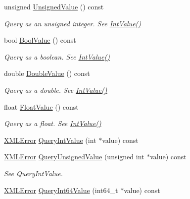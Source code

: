 \begin{DoxyCompactItemize}
\item 
unsigned \hyperlink{classtinyxml2_1_1_x_m_l_attribute_a0be5343b08a957c42c02c5d32c35d338}{Unsigned\+Value} () const
\begin{DoxyCompactList}\small\item\em Query as an unsigned integer. See \hyperlink{classtinyxml2_1_1_x_m_l_attribute_adfa2433f0fdafd5c3880936de9affa80}{Int\+Value()} \end{DoxyCompactList}\item 
bool \hyperlink{classtinyxml2_1_1_x_m_l_attribute_a98ce5207344ad33a265b0422addae1ff}{Bool\+Value} () const
\begin{DoxyCompactList}\small\item\em Query as a boolean. See \hyperlink{classtinyxml2_1_1_x_m_l_attribute_adfa2433f0fdafd5c3880936de9affa80}{Int\+Value()} \end{DoxyCompactList}\item 
double \hyperlink{classtinyxml2_1_1_x_m_l_attribute_a4aa73513f54ff0087d3e804f0f54e30f}{Double\+Value} () const
\begin{DoxyCompactList}\small\item\em Query as a double. See \hyperlink{classtinyxml2_1_1_x_m_l_attribute_adfa2433f0fdafd5c3880936de9affa80}{Int\+Value()} \end{DoxyCompactList}\item 
float \hyperlink{classtinyxml2_1_1_x_m_l_attribute_a27797b45d21c981257720db94f5f8801}{Float\+Value} () const
\begin{DoxyCompactList}\small\item\em Query as a float. See \hyperlink{classtinyxml2_1_1_x_m_l_attribute_adfa2433f0fdafd5c3880936de9affa80}{Int\+Value()} \end{DoxyCompactList}\item 
\hyperlink{namespacetinyxml2_a1fbf88509c3ac88c09117b1947414e08}{X\+M\+L\+Error} \hyperlink{classtinyxml2_1_1_x_m_l_attribute_a6d5176260db00ea301c01af8457cd993}{Query\+Int\+Value} (int $\ast$value) const
\item 
\hyperlink{namespacetinyxml2_a1fbf88509c3ac88c09117b1947414e08}{X\+M\+L\+Error} \hyperlink{classtinyxml2_1_1_x_m_l_attribute_a48a7f3496f1415832e451bd8d09c9cb9}{Query\+Unsigned\+Value} (unsigned int $\ast$value) const
\begin{DoxyCompactList}\small\item\em See Query\+Int\+Value. \end{DoxyCompactList}\item 
\hyperlink{namespacetinyxml2_a1fbf88509c3ac88c09117b1947414e08}{X\+M\+L\+Error} \hyperlink{classtinyxml2_1_1_x_m_l_attribute_a4e25344d6e4159026be34dbddf1dcac2}{Query\+Int64\+Value} (int64\+\_\+t $\ast$value) const

\end{DoxyCompactItemize}
